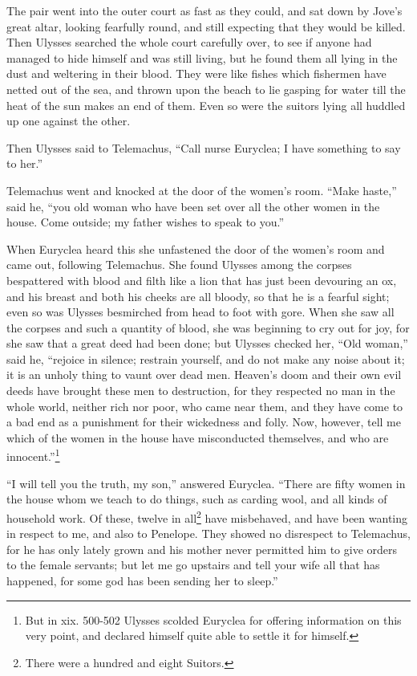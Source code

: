 The pair went into the outer court as fast as they could, and sat down by
Jove’s great altar, looking fearfully round, and still expecting that they
would be killed. Then Ulysses searched the whole court carefully over, to see
if anyone had managed to hide himself and was still living, but he found them
all lying in the dust and weltering in their blood. They were like fishes which
fishermen have netted out of the sea, and thrown upon the beach to lie gasping
for water till the heat of the sun makes an end of them. Even so were the
suitors lying all huddled up one against the other.

Then Ulysses said to Telemachus, “Call nurse Euryclea; I have something to say
to her.”

Telemachus went and knocked at the door of the women’s room. “Make haste,” said
he, “you old woman who have been set over all the other women in the house.
Come outside; my father wishes to speak to you.”

When Euryclea heard this she unfastened the door of the women’s room and came
out, following Telemachus. She found Ulysses among the corpses bespattered with
blood and filth like a lion that has just been devouring an ox, and his breast
and both his cheeks are all bloody, so that he is a fearful sight; even so was
Ulysses besmirched from head to foot with gore. When she saw all the corpses
and such a quantity of blood, she was beginning to cry out for joy, for she saw
that a great deed had been done; but Ulysses checked her, “Old woman,” said he,
“rejoice in silence; restrain yourself, and do not make any noise about it; it
is an unholy thing to vaunt over dead men. Heaven’s doom and their own evil
deeds have brought these men to destruction, for they respected no man in the
whole world, neither rich nor poor, who came near them, and they have come to a
bad end as a punishment for their wickedness and folly. Now, however, tell me
which of the women in the house have misconducted themselves, and who are
innocent.”\footnote{But in xix. 500-502 Ulysses scolded Euryclea for offering information on
this very point, and declared himself quite able to settle it for himself.}

“I will tell you the truth, my son,” answered Euryclea. “There are fifty women
in the house whom we teach to do things, such as carding wool, and all kinds of
household work. Of these, twelve in all\footnote{There were a hundred and eight Suitors.} have misbehaved, and have been
wanting in respect to me, and also to Penelope. They showed no disrespect to
Telemachus, for he has only lately grown and his mother never permitted him to
give orders to the female servants; but let me go upstairs and tell your wife
all that has happened, for some god has been sending her to sleep.”

